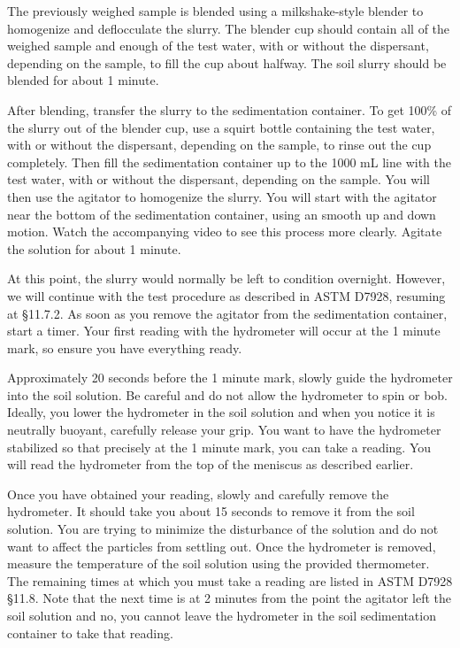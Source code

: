 \documentclass[12pt]{article}
\begin{document}
The previously weighed sample is blended using a milkshake-style blender to homogenize and deflocculate the slurry. The blender cup should contain all of the weighed sample and enough of the test water, with or without the dispersant, depending on the sample, to fill the cup about halfway. The soil slurry should be blended for about 1 minute.

After blending, transfer the slurry to the sedimentation container. To get 100\% of the slurry out of the blender cup, use a squirt bottle containing the test water, with or without the dispersant, depending on the sample, to rinse out the cup completely. Then fill the sedimentation container up to the 1000 mL line with the test water, with or without the dispersant, depending on the sample. You will then use the agitator to homogenize the slurry. You will start with the agitator near the bottom of the sedimentation container, using an smooth up and down motion. Watch the accompanying video to see this process more clearly. Agitate the solution for about 1 minute.

At this point, the slurry would normally be left to condition overnight. However, we will continue with the test procedure as described in ASTM D7928, resuming at \S11.7.2. As soon as you remove the agitator from the sedimentation container, start a timer. Your first reading with the hydrometer will occur at the 1 minute mark, so ensure you have everything ready.

Approximately 20 seconds before the 1 minute mark, slowly guide the hydrometer into the soil solution. Be careful and do not allow the hydrometer to spin or bob. Ideally, you lower the hydrometer in the soil solution and when you notice it is neutrally buoyant, carefully release your grip. You want to have the hydrometer stabilized so that precisely at the 1 minute mark, you can take a reading. You will read the hydrometer from the top of the meniscus as described earlier.

Once you have obtained your reading, slowly and carefully remove the hydrometer. It should take you about 15 seconds to remove it from the soil solution. You are trying to minimize the disturbance of the solution and do not want to affect the particles from settling out. Once the hydrometer is removed, measure the temperature of the soil solution using the provided thermometer. The remaining times at which you must take a reading are listed in ASTM D7928 \S11.8. Note that the next time is at 2 minutes from the point the agitator left the soil solution and no, you cannot leave the hydrometer in the soil sedimentation container to take that reading.
\end{document}
